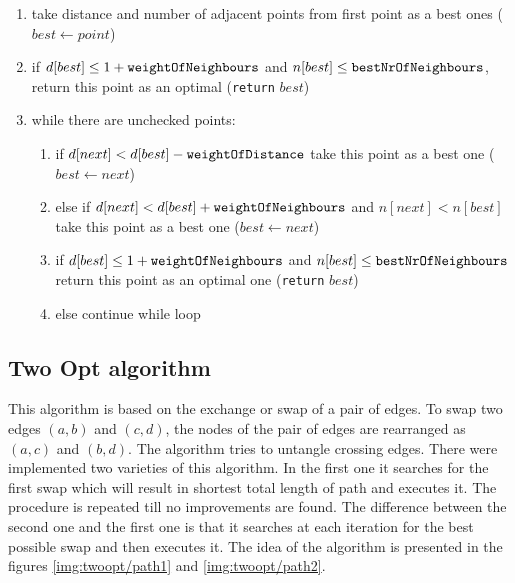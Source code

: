 \documentclass[titlepage]{article}
\begin{document}
\begin{enumerate}
	\item take distance and number of adjacent points from first point as a best ones ($best \leftarrow point$)
	\item if $d[best] \leq 1 + \mbox{\texttt{weightOfNeighbours}}$ and $n[best] \leq \mbox{\texttt{bestNrOfNeighbours}}$, return this point as an optimal (\texttt{return} $best$)
	\item while there are unchecked points:
	
	\begin{enumerate}[label*=\arabic*.]
		\item if $d[next] < d[best] - \mbox{\texttt{weightOfDistance}}$ take this point as a best one ($best \leftarrow next$)
		\item else if $d[next] < d[best] + \mbox{\texttt{weightOfNeighbours}}$ and $n[next] < n[best]$ take this point as a best one ($best \leftarrow next$)
		\item if $d[best] \leq 1 + \mbox{\texttt{weightOfNeighbours}}$ and $n[best] \leq \mbox{\texttt{bestNrOfNeighbours}}$ return this point as an optimal one (\texttt{return} $best$)
		\item else continue while loop
	\end{enumerate}
\end{enumerate}


\subsection{Two Opt algorithm}

This algorithm is based on the exchange or swap of a pair of edges. To swap two edges $(a, b)$ and $(c, d)$, the nodes of the pair of edges are rearranged as $(a, c)$ and $(b, d)$. The algorithm tries to untangle crossing edges. There were implemented two varieties of this algorithm. In the first one it searches for the first swap which will result in shortest total length of path and executes it. The procedure is repeated till no improvements are found. The difference between the second one and the first one is that it searches at each iteration for the best possible swap and then executes it. The idea of the algorithm is presented in the figures \ref{img:twoopt/path1} and \ref{img:twoopt/path2}.
\end{document}
